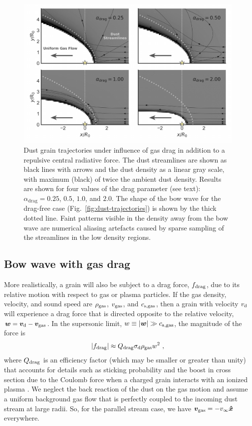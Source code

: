 \begin{figure}
  \centering
  \includegraphics[width=\linewidth]{figs/dust-couple-stream-annotate}
  \caption{Dust grain trajectories under influence of gas drag in
    addition to a repulsive central radiative force.  The dust
    streamlines are shown as black lines with arrows and the dust
    density as a linear gray scale, with maximum (black) of twice the
    ambient dust density.  Results are shown for four values of the
    drag parameter (see text): \(\alpha_\text{drag} = 0.25\), \(0.5\),
    \(1.0\), and \(2.0\). The shape of the bow wave for the drag-free
    case (Fig.~\ref{fig:dust-trajectories}) is shown by the thick
    dotted line.  Faint patterns visible in the density away from the
    bow wave are numerical aliasing artefacts caused by sparse
    sampling of the streamlines in the low density regions.}
  \label{fig:dust-wave-coupling}
\end{figure}


\subsection{Bow wave with gas drag}
\label{sec:bow-wave-drag}
More realistically, a grain will also be subject to a drag force,
\(f_{\text{drag}}\), due to its relative motion with respect to gas or plasma
particles. If the gas density, velocity, and sound speed are
\(\rho_{\text{gas}}\), \(v_{\text{gas}}\), and \(c_{\text{s,gas}}\), then a grain with velocity
\(v_{\text{d}}\) will experience a drag force that is directed opposite to
the relative velocity, \(\bm{w} = \bm{v}_{\text{d}} - \bm{v}_{\text{gas}}\).  In the
supersonic limit, \(w \equiv \lvert\bm{w}\rvert \gg c_{\text{s,gas}}\), the magnitude of
the force is
\begin{equation}
  \label{eq:dust-fdrag}
  \lvert f_{\text{drag}}\rvert \approx Q_{\text{drag}} \sigma_{\text{d}} \rho_{\text{gas}} w^2 \ ,
\end{equation}
where \(Q_{\text{drag}}\) is an efficiency factor (which may be smaller or
greater than unity) that accounts for details such as sticking
probability and the boost in cross section due to the Coulomb force
when a charged grain interacts with an ionized plasma
\citep{Draine:1979a}.  We neglect the back reaction of the dust on the
gas motion and assume a uniform background gas flow that is perfectly
coupled to the incoming dust stream at large radii.  So, for the
parallel stream case, we have \(\bm{v}_{\text{gas}} = -v_\infty \bm{\hat{x}}\) everywhere.

